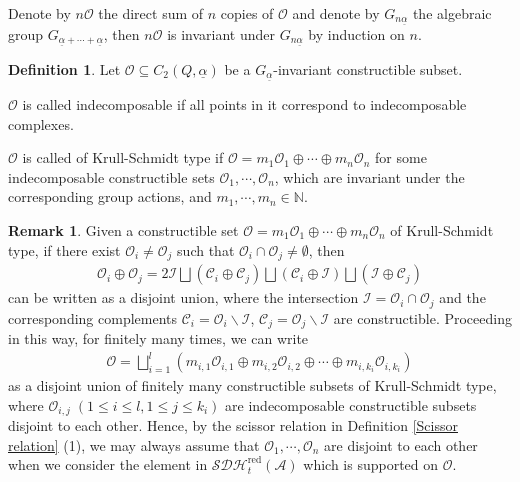 \documentclass[12pt]{amsart}
\theoremstyle{definition}
\newtheorem{definition}[theorem]{Definition}
\newtheorem{remark}[theorem]{Remark}
\numberwithin{equation}{section}
\begin{document}
Denote by $ n\mathcal{O} $ the direct sum of $ n $ copies of $ \mathcal{O} $ and denote by $ G_{n\underline{\alpha}} $ the algebraic group $ G_{\underline{\alpha}+\cdots+ \underline{\alpha}} $, then $ n\mathcal{O} $ is invariant under $ G_{n\underline{\alpha}} $ by induction on $ n $. 

\begin{definition}
    Let $ \mathcal{O} \subseteq C_2(Q,\underline{\alpha}) $ be a $G_{\underline{\alpha}}$-invariant constructible subset. 
    
    $ \mathcal{O} $ is called indecomposable if all points in it correspond to indecomposable complexes. 
    
    $ \mathcal{O} $ is called of Krull-Schmidt type if $ \mathcal{O} = m_1 \mathcal{O}_1 \oplus \cdots \oplus m_n \mathcal{O}_n $
    for some indecomposable constructible sets $ \mathcal{O}_1, \cdots, \mathcal{O}_n $, which are invariant under the corresponding group actions, and $ m_1, \cdots, m_n \in \mathbb{N} $. 
       
\end{definition}

\begin{remark}
    \label{disjoint union}
    Given a constructible set $ \mathcal{O} = m_1 \mathcal{O}_1 \oplus \cdots \oplus m_n \mathcal{O}_n $ of Krull-Schmidt type, if there exist $ \mathcal{O}_i \neq \mathcal{O}_j $ such that $ \mathcal{O}_i \cap \mathcal{O}_j \neq \emptyset  $, then
\begin{align*}
    \mathcal{O}_i \oplus \mathcal{O}_j = 2 {\mathcal{I}} \bigsqcup ({\mathcal{C}}_i \oplus {\mathcal{C}}_j) \bigsqcup ({\mathcal{C}}_i \oplus {\mathcal{I}}) \bigsqcup ({\mathcal{I}} \oplus {\mathcal{C}}_j)
\end{align*}
can be written as a disjoint union, where the intersection $ \mathcal{I} = \mathcal{O}_i \cap \mathcal{O}_j$ and the corresponding complements $ {\mathcal{C}}_i=\mathcal{O}_i \backslash {\mathcal{I}} $, $ {\mathcal{C}}_j=\mathcal{O}_j \backslash {\mathcal{I}} $ are constructible. 
Proceeding in this way, for finitely many times, we can write
\begin{align*}
    \mathcal{O} = \bigsqcup_{i=1}^l (m_{i,1}\mathcal{O}_{i,1} \oplus m_{i,2}\mathcal{O}_{i,2} \oplus  \cdots \oplus m_{i,k_i}\mathcal{O}_{i,k_i})
\end{align*}
as a disjoint union of finitely many constructible subsets of Krull-Schmidt type, where $ \mathcal{O}_{i,j}\;( 1 \leqslant i \leqslant l,1 \leqslant j \leqslant k_i ) $ are indecomposable constructible subsets disjoint to each other. 
Hence, by the scissor relation in Definition \ref{Scissor relation} (1), we may always assume that $ \mathcal{O}_1, \cdots, \mathcal{O}_n $ are disjoint to each other when we consider the element in $ \mathcal{SDH}^{\mathrm{red}}_t(\mathcal{A}) $ which is supported on $ \mathcal{O} $.
\end{remark}
\end{document}
